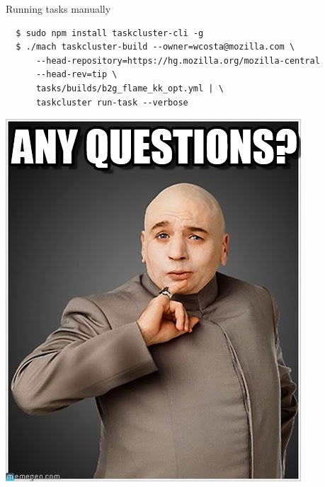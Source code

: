\documentclass[pdf]{beamer}
\begin{document}
\begin{frame}[fragile]{Running tasks manually}
  \scriptsize
  \begin{lstlisting}
  $ sudo npm install taskcluster-cli -g
  $ ./mach taskcluster-build --owner=wcosta@mozilla.com \
      --head-repository=https://hg.mozilla.org/mozilla-central
      --head-rev=tip \
      tasks/builds/b2g_flame_kk_opt.yml | \
      taskcluster run-task --verbose
  \end{lstlisting}
\end{frame}

\begin{frame}
  \begin{center}
    \includegraphics[scale=0.30]{img/questions.jpg}
  \end{center}
\end{frame}
\end{document}
